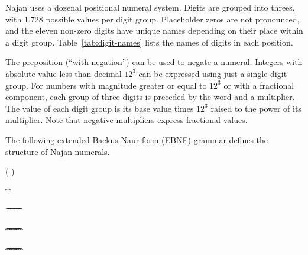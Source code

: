 

Najan uses a dozenal positional numeral system. Digits are grouped into threes,
with 1,728 possible values per digit group. Placeholder zeros are not
pronounced, and the eleven non-zero digits have unique names depending on their
place within a digit group. Table~\ref{tab:digit-names} lists the names of
digits in each position.

The preposition  (``with negation'') can be used to negate a
numeral. Integers with absolute value less than decimal $12^3$ can be expressed
using just a single digit group. For numbers with magnitude greater or equal to
$12^3$ or with a fractional component, each group of three digits is preceded by
the word  and a multiplier. The value of each digit group is its
base value times $12^3$ raised to the power of its multiplier. Note that
negative multipliers express fractional values.

The following extended Backus-Naur form (EBNF) grammar defines the structure of
Najan numerals.

\begin{ebnf}
	 \is {} ( \alt {})

	 \is {}  
	\altLine {} 
	\altLine {}
	\altLine \t{}

	 \is \t{} \alt \t{} \alt \t{} \alt \t{} \alt \t{} \alt \t{} \alt \t{}

	 \is \t{} \alt \t{} \alt \t{} \alt \t{} \alt \t{} \alt \t{} \alt \t{}

	 \is \t{} \alt \t{} \alt \t{} \alt \t{} \alt \t{} \alt \t{} \alt \t{}
\end{ebnf}

